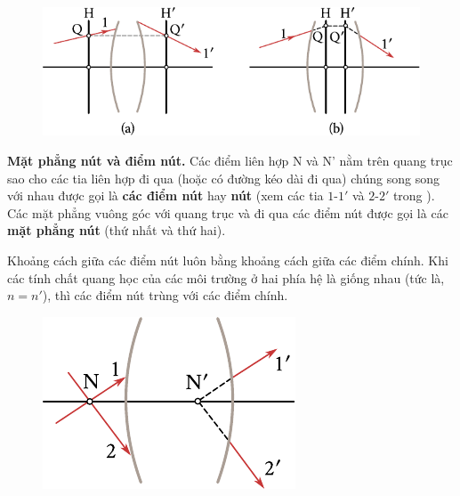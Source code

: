 \begin{figure}[!htb]
	\begin{center}
		\includegraphics[scale=1]{figures/ch_16/fig_16_16h.pdf}
        \caption[]{}
		\label{fig:16_16}
	\end{center}
	\vspace{-0.7cm}
\end{figure}

\textbf{Mặt phẳng nút và điểm nút.}
Các điểm liên hợp N và N' nằm trên quang trục sao cho các tia liên hợp đi qua (hoặc có đường kéo dài đi qua) chúng song song với nhau được gọi là \textbf{các điểm nút} hay \textbf{nút} (xem các tia $1$-$1'$ và $2$-$2'$ trong ).
Các mặt phẳng vuông góc với quang trục và đi qua các điểm nút được gọi là các \textbf{mặt phẳng nút} (thứ nhất và thứ hai).

Khoảng cách giữa các điểm nút luôn bằng khoảng cách giữa các điểm chính.
Khi các tính chất quang học của các môi trường ở hai phía hệ là giống nhau (tức là, $n = n'$), thì các điểm nút trùng với các điểm chính.

\begin{figure}[!htb]
	\begin{center}
		\includegraphics[scale=1]{figures/ch_16/fig_16_17.pdf}
        \caption[]{}
		\label{fig:16_17}
	\end{center}
	\vspace{-0.8cm}
\end{figure}

